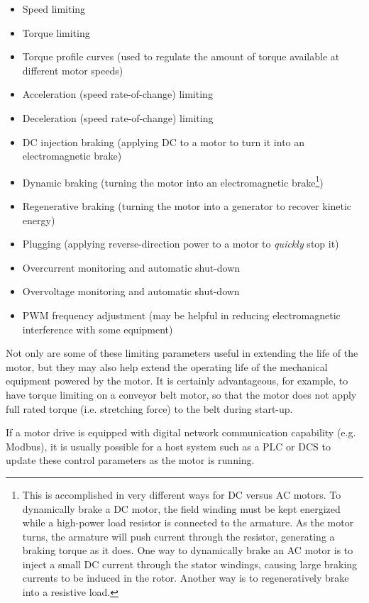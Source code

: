 \begin{itemize}
\item Speed limiting
\item Torque limiting
\item Torque profile curves (used to regulate the amount of torque available at different motor speeds)
\item Acceleration (speed rate-of-change) limiting
\item Deceleration (speed rate-of-change) limiting
\item DC injection braking (applying DC to a motor to turn it into an electromagnetic brake)
\item Dynamic braking (turning the motor into an electromagnetic brake\footnote{This is accomplished in very different ways for DC versus AC motors.  To dynamically brake a DC motor, the field winding must be kept energized while a high-power load resistor is connected to the armature.  As the motor turns, the armature will push current through the resistor, generating a braking torque as it does.  One way to dynamically brake an AC motor is to inject a small DC current through the stator windings, causing large braking currents to be induced in the rotor.  Another way is to regeneratively brake into a resistive load.})
\item Regenerative braking (turning the motor into a generator to recover kinetic energy)
\item Plugging (applying reverse-direction power to a motor to \textit{quickly} stop it)
\item Overcurrent monitoring and automatic shut-down
\item Overvoltage monitoring and automatic shut-down
\item PWM frequency adjustment (may be helpful in reducing electromagnetic interference with some equipment)
\end{itemize}

Not only are some of these limiting parameters useful in extending the life of the motor, but they may also help extend the operating life of the mechanical equipment powered by the motor.  It is certainly advantageous, for example, to have torque limiting on a conveyor belt motor, so that the motor does not apply full rated torque (i.e. stretching force) to the belt during start-up.

If a motor drive is equipped with digital network communication capability (e.g. Modbus), it is usually possible for a host system such as a PLC or DCS to update these control parameters as the motor is running.

